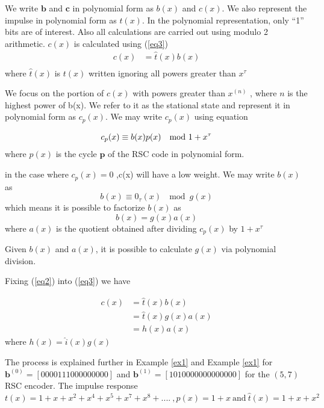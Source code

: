 \documentclass[conference]{IEEEtran}
\begin{document}
 We write $\textbf{b}$ and $\textbf{c}$ in polynomial form as $b(x)$ and $c(x)$. We also represent the impulse in polynomial form as $t(x)$. In the polynomial representation, only ``1'' bits are of interest. Also all calculations are carried out using modulo 2 arithmetic.
$c(x)$ is calculated using (\ref{eq3})
 \begin{equation}
 \begin{split}
 c(x)&=\hat{t}(x)b(x)\\
 \end{split}
 \label{eq3}
 \end{equation}
 where $\hat{t}(x)$ is $t(x)$ written ignoring all powers greater than $x^{\tau}$
 
 We focus on the portion of $c(x)$ with powers greater than $x^{(n)}$ , where $n$ is the highest power of b(x). We refer to it as the stational state and represent it in polynomial form as $c_p(x)$.  We may write $c_p(x)$ using equation 

 \begin{equation}
 c_p(x)  \equiv b(x)p(x) ~\mod{ 1+ x^{\tau}}\\
 \label{eq1}
 \end{equation}
where $p(x)$ is the cycle $\textbf{p}$ of the  RSC code in polynomial form.
 
 in the case where $c_p(x) = 0$ ,c(x) will have a low weight.  We may write $b(x)$ as 
 $$b(x) \equiv  0_{\tau}(x) ~\mod{ g(x)} $$ which means  it is possible to factorize $b(x)$ as 
 \begin{equation}
 b(x) =g(x)a(x)
 \label{eq2}
 \end{equation}
 where $a(x)$ is the quotient obtained after dividing $c_p(x)$ by $1+ x^{\tau}$
 
 Given $b(x)$ and $a(x)$, it is possible to calculate $g(x)$ via polynomial division.
 
 Fixing (\ref{eq2}) into (\ref{eq3}) we have 
 
 \begin{equation}
 \begin{split}
 c(x)&=\hat{t}(x)b(x)\\
 &=\hat{t}(x)g(x)a(x)\\
 & = h(x)a(x)
 \end{split}
 \label{eq4}
 \end{equation}
 where  $h(x)=\hat{i}(x)g(x)$ 
 
 The process is explained further in Example  \ref{ex1}  and Example  \ref{ex1} for $\textbf{b}^{(0)}=[ 0 0 0 0 1 1 1 0 0 0 0 0 0 0 0 0]$ and  $\textbf{b}^{(1)}=[ 1 0 1 0 0 0 0 0 0 0 0 0 0 0 0 0 ]$ for the $(5,7)$ RSC encoder. The impulse response $t(x)=1+x+x^2+x^4+x^5+x^7+x^8+....~,p(x)=1+x ~ \text{and} ~ \hat{t}(x)=1+x+x^2$
 
\end{document}
